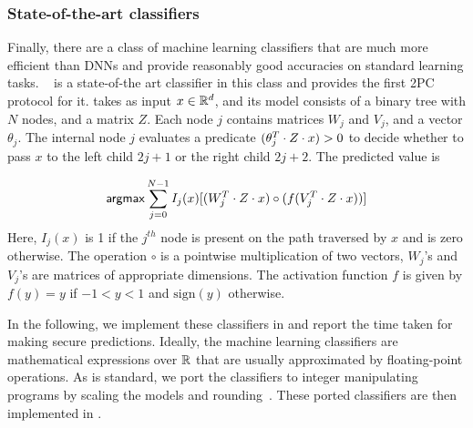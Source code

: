 \subsubsection*{State-of-the-art classifiers}
Finally, there are a class of machine learning classifiers that are
much more efficient than
DNNs and provide reasonably good accuracies on standard learning
tasks. \bonsai~\cite{bonsai} is a state-of-the art classifier in this
class and \tool provides the first 2PC protocol for it.
\bonsai takes as input $x \in {\mathbb{R}}^d$, and its model consists of a
binary tree with $N$ nodes, and a matrix $Z$. Each node $j$ contains
matrices $W_j$ and $V_j$, and a vector $\theta_{j}$. The internal node
$j$  evaluates a predicate $(\theta_j^T \cdot Z \cdot x) > 0$ to decide whether
to pass $x$ to the left child $2j+1$ or the right child $2j+2$.
The predicted value is

\[
{\sf argmax} \sum_{j = 0}^{N - 1} I_j(x)[ (W_j^T\cdot Z\cdot x) \circ (f(V_j^T\cdot Z\cdot x))] 
\]
Here, $I_j(x)$ is 1 if the $j^{th}$ node is present on the path traversed by $x$
and is zero otherwise. 
The operation $\circ$ is a pointwise multiplication of two vectors, $W_j$'s and $V_j$'s
are matrices of appropriate dimensions. The activation function $f$ is given by $f(y) = y$ if
$-1 < y < 1$ and $\mathrm{sign}(y)$ otherwise.

In the following, we implement these classifiers in \tool and report
the time taken for making secure predictions. Ideally, the machine
learning classifiers are mathematical expressions over ${\mathbb{R}}$ that are
usually approximated by floating-point operations. 
As is standard, we port the classifiers to integer manipulating
programs by scaling the models and rounding~\cite{minionn}. These
ported classifiers are then implemented in \tool.

